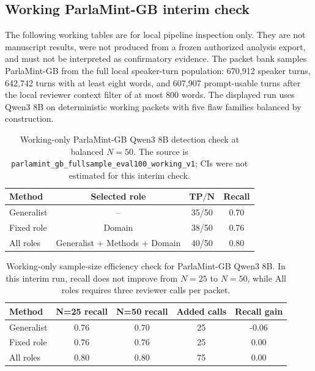 \ifpredatadraft
\subsection{Working ParlaMint-GB interim check}

The following working tables are for local pipeline inspection only. They are not manuscript results, were not produced from a frozen authorized analysis export, and must not be interpreted as confirmatory evidence. The packet bank samples ParlaMint-GB from the full local speaker-turn population: 670,912 speaker turns, 642,742 turns with at least eight words, and 607,907 prompt-usable turns after the local reviewer context filter of at most 800 words. The displayed run uses Qwen3 8B on deterministic working packets with five flaw families balanced by construction.

\begin{table}[t]
\centering
\scriptsize
\setlength{\tabcolsep}{3.2pt}
\renewcommand{\arraystretch}{1.05}
\begin{tabular}{@{}lccc@{}}
\toprule
\textbf{Method} & \textbf{Selected role} & $\boldsymbol{TP/N}$ & \textbf{Recall} \\
\midrule
Generalist & -- & 35/50 & 0.70 \\
Fixed role & Domain & 38/50 & 0.76 \\
All roles & Generalist + Methods + Domain & 40/50 & 0.80 \\
\bottomrule
\end{tabular}
\caption{Working-only ParlaMint-GB Qwen3 8B detection check at balanced \(N=50\). The source is \texttt{parlamint\_gb\_fullsample\_eval100\_working\_v1}; CIs were not estimated for this interim check.}
\label{tab:working_parlamint_qwen_n50}
\end{table}

\begin{table}[t]
\centering
\scriptsize
\setlength{\tabcolsep}{3.2pt}
\renewcommand{\arraystretch}{1.05}
\begin{tabular}{@{}lcccc@{}}
\toprule
\textbf{Method} & \textbf{N=25 recall} & \textbf{N=50 recall} & \textbf{Added calls} & \textbf{Recall gain} \\
\midrule
Generalist & 0.76 & 0.70 & 25 & -0.06 \\
Fixed role & 0.76 & 0.76 & 25 & 0.00 \\
All roles & 0.80 & 0.80 & 75 & 0.00 \\
\bottomrule
\end{tabular}
\caption{Working-only sample-size efficiency check for ParlaMint-GB Qwen3 8B. In this interim run, recall does not improve from \(N=25\) to \(N=50\), while All roles requires three reviewer calls per packet.}
\label{tab:working_parlamint_efficiency}
\end{table}
\fi

